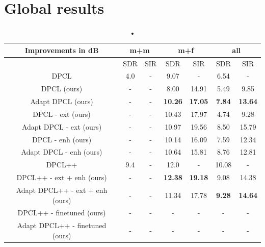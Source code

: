 \documentclass[master, tikz, final,11pt, dvipdfmx]{iscs-thesis}
\begin{document}
\section{Global results}




\begin{table}[h]

\begin{tabular}{c|c|c|c|c|c|c}
Improvements in dB & \multicolumn{2}{c|}{m+m} & \multicolumn{2}{c|}{m+f} & \multicolumn{2}{c}{all} \\ 
\hline 
 & SDR & SIR & SDR & SIR & SDR & SIR \\ 
\hline 
DPCL \cite{DPCLV1} & 4.0 & - & 9.07 & - & 6.54 & - \\ 
\hline 
DPCL (ours) & - & - & 8.00 & 14.91 & 5.49 & 9.85 \\ 
\hline 
Adapt DPCL (ours) & - & - & \textbf{10.26} & \textbf{17.05} & \textbf{7.84} & \textbf{13.64} \\ 
\hline 
\hline 
DPCL - ext (ours) & - & - & 10.43 & 17.97 & 4.74 & 9.28 \\ 
\hline 
Adapt DPCL - ext (ours) & - & - & 10.97 & 19.56 & 8.50 & 15.79 \\ 
\hline 
\hline 
DPCL - enh (ours) & - & - & 10.14 & 16.09 & 
7.59 & 12.34 \\ 
\hline 
Adapt DPCL - enh (ours) & - & - & 10.64 & 15.81 & 
8.76 & 12.81 \\ 
\hline
\hline 
DPCL++ \cite{DPCLV2} & 9.4 & - & 12.0 & - & 10.08 & - \\ 
\hline 
DPCL++ - ext + enh (ours) & - & - & \textbf{12.38} & \textbf{19.18} & 9.08 & 14.38 \\ 
\hline 
Adapt DPCL++ - ext + enh (ours) & - & - & 11.34 & 17.78 & \textbf{9.28} & \textbf{14.64} \\ 
\hline 
\hline 
DPCL++ - finetuned (ours) & - & - & - & - & - & - \\ 
Adapt DPCL++ - finetuned (ours) & - & - & - & - & - & - \\ 
\end{tabular}
\caption{•}
\end{table}
\end{document}

